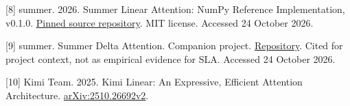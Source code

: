 \documentclass[11pt,a4paper]{article}
\begin{document}

{[}8{]} summer. 2026. Summer Linear Attention: NumPy Reference Implementation, v0.1.0. \href{https://github.com/Summer110622/SummerLinearAttention/tree/036512212ed0f7d2456988cb4b523599064a7e6f}{Pinned source repository}. MIT license. Accessed 24 October 2026.


{[}9{]} summer. Summer Delta Attention. Companion project. \href{https://github.com/Summer110622/SummerDeltaAttention}{Repository}. Cited for project context, not as empirical evidence for SLA. Accessed 24 October 2026.


{[}10{]} Kimi Team. 2025. Kimi Linear: An Expressive, Efficient Attention Architecture. \href{https://arxiv.org/abs/2510.26692v2}{arXiv:2510.26692v2}.
\end{document}
